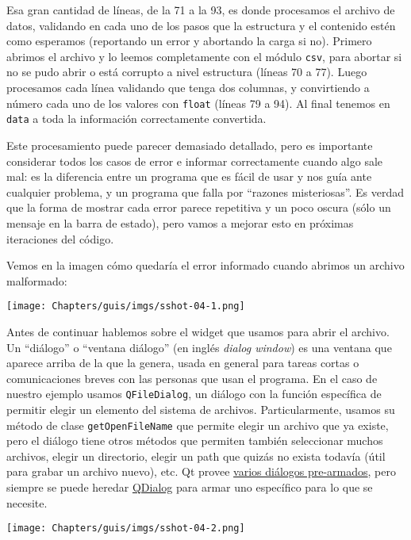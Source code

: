 Esa gran cantidad de líneas, de la 71 a la 93, es donde procesamos el archivo de datos, validando en cada uno de los pasos que la estructura y el contenido estén como esperamos (reportando un error y abortando la carga si no). Primero abrimos el archivo y lo leemos completamente con el módulo \texttt{csv}, para abortar si no se pudo abrir o está corrupto a nivel estructura (líneas 70 a 77). Luego procesamos cada línea validando que tenga dos columnas, y convirtiendo a número cada uno de los valores con \texttt{float} (líneas 79 a 94). Al final tenemos en \texttt{data} a toda la información correctamente convertida.

Este procesamiento puede parecer demasiado detallado, pero es importante considerar todos los casos de error e informar correctamente cuando algo sale mal: es la diferencia entre un programa que es fácil de usar y nos guía ante cualquier problema, y un programa que falla por ``razones misteriosas''. Es verdad que la forma de mostrar cada error parece repetitiva y un poco oscura (sólo un mensaje en la barra de estado), pero vamos a mejorar esto en próximas iteraciones del código.

Vemos en la imagen cómo quedaría el error informado cuando abrimos un archivo malformado:

\begin{center}
    \texttt{[image: Chapters/guis/imgs/sshot-04-1.png]}
\end{center}

Antes de continuar hablemos sobre el widget que usamos para abrir el archivo. Un ``diálogo'' o ``ventana diálogo'' (en inglés \textit{dialog window}) es una ventana que aparece arriba de la que la genera, usada en general para tareas cortas o comunicaciones breves con las personas que usan el programa. En el caso de nuestro ejemplo usamos \texttt{QFileDialog}, un diálogo con la función específica de permitir elegir un elemento del sistema de archivos. Particularmente, usamos su método de clase \texttt{getOpenFileName} que permite elegir un archivo que ya existe, pero el diálogo tiene otros métodos que permiten también seleccionar muchos archivos, elegir un directorio, elegir un path que quizás no exista todavía (útil para grabar un archivo nuevo), etc. Qt provee \href{https://doc.qt.io/qt-6/dialogs.html}{varios diálogos pre-armados}, pero siempre se puede heredar \href{https://doc.qt.io/qt-6/qdialog.html}{QDialog} para armar uno específico para lo que se necesite.

\begin{center}
    \texttt{[image: Chapters/guis/imgs/sshot-04-2.png]}
\end{center}

